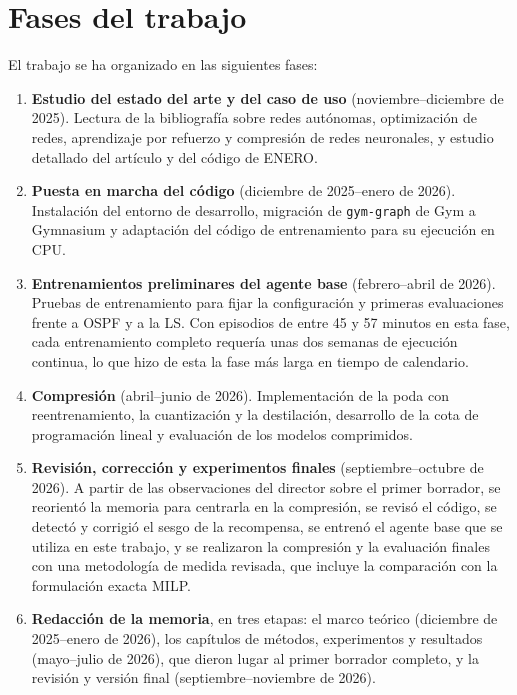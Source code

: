 \section{Fases del trabajo}\label{sec:fases}

El trabajo se ha organizado en las siguientes fases:

\begin{enumerate}
	\item \textbf{Estudio del estado del arte y del caso de uso} (noviembre--diciembre de 2025). Lectura de la bibliografía sobre redes autónomas, optimización de redes, aprendizaje por refuerzo y compresión de redes neuronales, y estudio detallado del artículo y del código de ENERO.
	\item \textbf{Puesta en marcha del código} (diciembre de 2025--enero de 2026). Instalación del entorno de desarrollo, migración de \texttt{gym-graph} de Gym a Gymnasium y adaptación del código de entrenamiento para su ejecución en CPU.
	\item \textbf{Entrenamientos preliminares del agente base} (febrero--abril de 2026). Pruebas de entrenamiento para fijar la configuración y primeras evaluaciones frente a OSPF y a la LS. Con episodios de entre 45 y 57 minutos en esta fase, cada entrenamiento completo requería unas dos semanas de ejecución continua, lo que hizo de esta la fase más larga en tiempo de calendario.
	\item \textbf{Compresión} (abril--junio de 2026). Implementación de la poda con reentrenamiento, la cuantización y la destilación, desarrollo de la cota de programación lineal y evaluación de los modelos comprimidos.
	\item \textbf{Revisión, corrección y experimentos finales} (septiembre--octubre de 2026). A partir de las observaciones del director sobre el primer borrador, se reorientó la memoria para centrarla en la compresión, se revisó el código, se detectó y corrigió el sesgo de la recompensa, se entrenó el agente base que se utiliza en este trabajo, y se realizaron la compresión y la evaluación finales con una metodología de medida revisada, que incluye la comparación con la formulación exacta MILP.
	\item \textbf{Redacción de la memoria}, en tres etapas: el marco teórico (diciembre de 2025--enero de 2026), los capítulos de métodos, experimentos y resultados (mayo--julio de 2026), que dieron lugar al primer borrador completo, y la revisión y versión final (septiembre--noviembre de 2026).
\end{enumerate}

